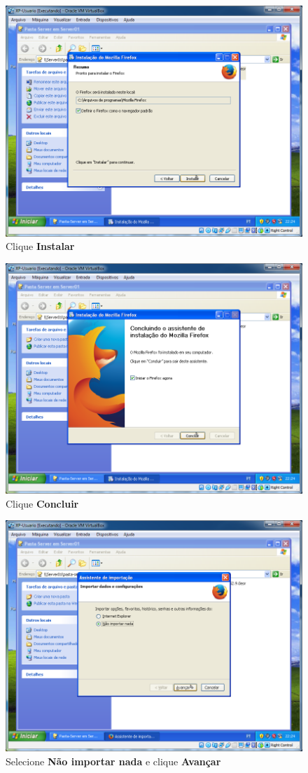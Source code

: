 \documentclass[10pt]{article}
\begin{document}
\begin{figure}[H]
    \centering
    \caption{Clique \textbf{Instalar}}
    \label{fig:re074}
    \includegraphics[width=\linewidth]{images/rede_externa/re074.png}
\end{figure}
\begin{figure}[H]
    \centering
    \caption{Clique \textbf{Concluir}}
    \label{fig:re075}
    \includegraphics[width=\linewidth]{images/rede_externa/re075.png}
\end{figure}
\begin{figure}[H]
    \centering
    \caption{Selecione \textbf{Não importar nada} e clique \textbf{Avançar}}
    \label{fig:re076}
    \includegraphics[width=\linewidth]{images/rede_externa/re076.png}
\end{figure}
\end{document}
